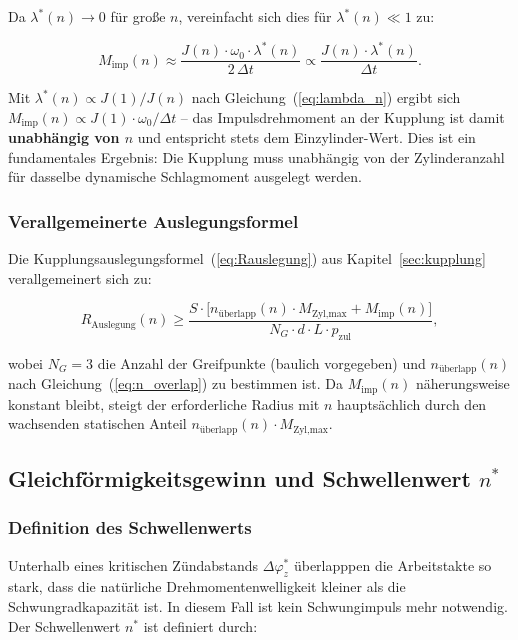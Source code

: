 ﻿\documentclass[a4paper,12pt]{article}
\begin{document}
Da $\lambda^*(n) \to 0$ für große $n$, vereinfacht sich dies für
$\lambda^*(n) \ll 1$ zu:

\begin{equation}
  M_\text{imp}(n) \approx \frac{J(n) \cdot \omega_0 \cdot \lambda^*(n)}
    {2\,\Delta t}
  \propto \frac{J(n) \cdot \lambda^*(n)}{\Delta t}.
  \label{eq:M_imp_n_approx}
\end{equation}

Mit $\lambda^*(n) \propto J(1)/J(n)$ nach Gleichung~(\ref{eq:lambda_n})
ergibt sich $M_\text{imp}(n) \propto J(1) \cdot \omega_0 / \Delta t$ --
das Impulsdrehmoment an der Kupplung ist damit \textbf{unabhängig von $n$}
und entspricht stets dem Einzylinder-Wert. Dies ist ein fundamentales
Ergebnis: Die Kupplung muss unabhängig von der Zylinderanzahl für
dasselbe dynamische Schlagmoment ausgelegt werden.

\subsubsection*{Verallgemeinerte Auslegungsformel}

Die Kupplungsauslegungsformel~(\ref{eq:Rauslegung}) aus
Kapitel~\ref{sec:kupplung} verallgemeinert sich zu:

\begin{equation}
  \boxed{
  R_\text{Auslegung}(n) \geq \frac{S \cdot \bigl[n_\text{überlapp}(n)
    \cdot M_\text{Zyl,max} + M_\text{imp}(n)\bigr]}
    {N_G \cdot d \cdot L \cdot p_\text{zul}},
  }
  \label{eq:Rauslegung_n}
\end{equation}

\noindent
wobei $N_G = 3$ die Anzahl der Greifpunkte (baulich vorgegeben) und
$n_\text{überlapp}(n)$ nach Gleichung~(\ref{eq:n_overlap}) zu bestimmen ist.
Da $M_\text{imp}(n)$ näherungsweise konstant bleibt, steigt der erforderliche
Radius mit $n$ hauptsächlich durch den wachsenden statischen Anteil
$n_\text{überlapp}(n) \cdot M_\text{Zyl,max}$.

\subsection{Gleichförmigkeitsgewinn und Schwellenwert $n^*$}

\subsubsection*{Definition des Schwellenwerts}

Unterhalb eines kritischen Zündabstands $\Delta\varphi_z^*$ überlapppen
die Arbeitstakte so stark, dass die natürliche Drehmomentenwelligkeit
kleiner als die Schwungradkapazität ist. In diesem Fall ist kein
Schwungimpuls mehr notwendig. Der Schwellenwert $n^*$ ist definiert durch:
\end{document}
